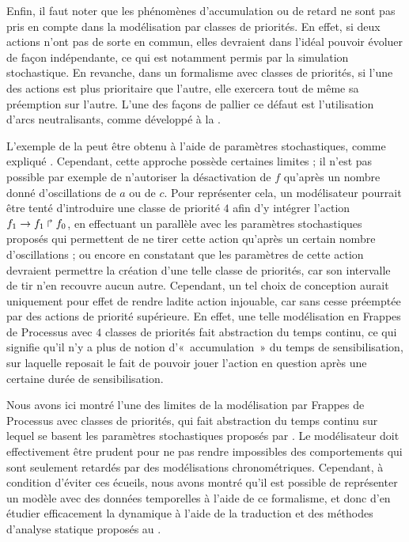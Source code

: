 \begin{example}
\end{example}

Enfin, il faut noter que
les phénomènes d'accumulation ou de retard ne sont pas pris en compte dans la modélisation
par classes de priorités.
En effet, si deux actions n'ont pas de sorte en commun, elles devraient dans l'idéal pouvoir
évoluer de façon indépendante, ce qui est notamment permis par la simulation stochastique.
En revanche, dans un formalisme avec classes de priorités, si l'une des actions est plus
prioritaire que l'autre, elle exercera tout de même sa préemption sur l'autre.
L'une des façons de pallier ce défaut est l'utilisation d'arcs neutralisants,
comme développé à la .

\begin{example}
  L'exemple de la 
  peut être obtenu à l'aide de paramètres stochastiques,
  comme expliqué .
  Cependant, cette approche possède certaines limites ;
  il n'est pas possible par exemple de n'autoriser la désactivation de $f$
  qu'après un nombre donné d'oscillations de $a$ ou de $c$.
  Pour représenter cela, un modélisateur pourrait être tenté d'introduire une classe de
  priorité $4$ afin d'y intégrer l'action $f_1\rightarrow f_1\Rsh f_0$,
  en effectuant un parallèle avec les paramètres stochastiques proposés
  qui permettent de ne tirer cette action qu'après un certain nombre d'oscillations ;
  ou encore en constatant que les paramètres de cette action devraient permettre
  la création d'une telle classe de priorités, car son intervalle de tir n'en recouvre
  aucun autre.
  Cependant, un tel choix de conception aurait uniquement pour effet de rendre ladite action
  injouable, car sans cesse préemptée par des actions de priorité supérieure.
  En effet, une telle modélisation en Frappes de Processus avec $4$ classes de priorités
  fait abstraction du temps continu,
  ce qui signifie qu'il n'y a plus de notion d'«~accumulation~» du temps de sensibilisation,
  sur laquelle reposait le fait de pouvoir jouer l'action en question après une certaine
  durée de sensibilisation.
\end{example}

Nous avons ici montré l'une des limites de la modélisation par
Frappes de Processus avec classes de priorités, qui fait abstraction du temps
continu sur lequel se basent les paramètres stochastiques proposés par \cite{PMR10-TCSB}.
Le modélisateur doit effectivement être prudent pour ne pas rendre impossibles des
comportements qui sont seulement retardés par des modélisations chronométriques.
Cependant, à condition d'éviter ces écueils, nous avons montré qu'il est possible
de représenter un modèle avec des données temporelles à l'aide de ce formalisme,
et donc d'en étudier efficacement la dynamique à l'aide
de la traduction et des méthodes d'analyse statique proposés au .
